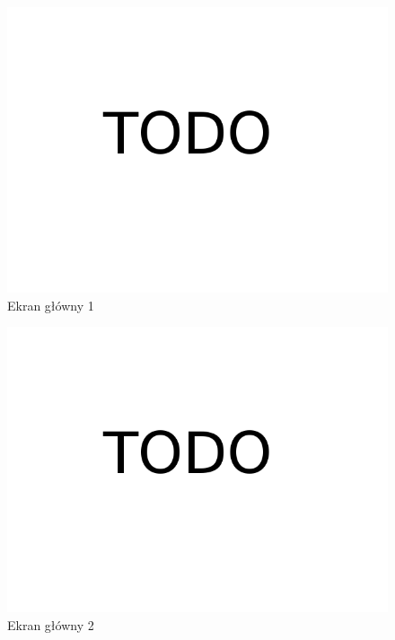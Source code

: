 \documentclass[licencjacka]{pracamgr}
\begin{document}
\begin{figure}[H]
\centering
\includegraphics[scale=0.3,center]{todo}
\caption{Ekran główny 1}
\end{figure}

\begin{figure}[H]
\centering
\includegraphics[scale=0.3,center]{todo}
\caption{Ekran główny 2}
\end{figure}
\end{document}

